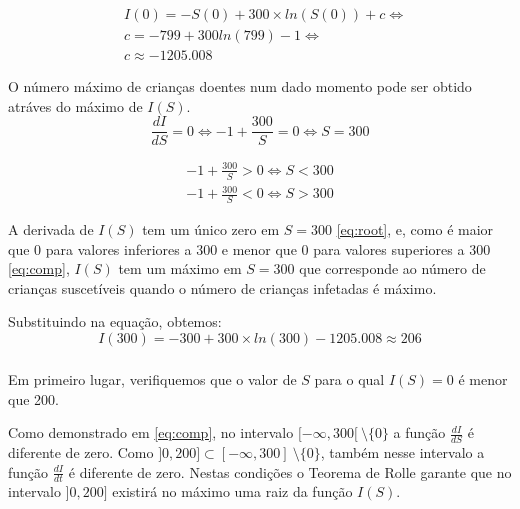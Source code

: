 \documentclass[portuguese, a4paper]{article}
\newcommand\eq[0]{\Leftrightarrow}
\begin{document}
		\begin{equation}
		\begin{split}
			& I(0) = -S(0) + 300 \times ln(S(0)) + c \eq \\
			& c = -799 + 300ln(799) - 1 \eq \\
			& c \approx -1205.008
		\end{split}
		\end{equation}

		\par
		O número máximo de crianças doentes num dado momento pode ser obtido
		atráves do máximo de $I(S)$.
		\begin{equation}
			\label{eq:root}
			\frac{dI}{dS} = 0 \eq -1 + \frac{300}{S} = 0
			\eq S = 300
		\end{equation}

		\begin{equation}
		\begin{split}
			\label{eq:comp}
			 -1 + \frac{300}{S} > 0 \eq S < 300 \\
			 -1 + \frac{300}{S} < 0 \eq S > 300
		\end{split}
		\end{equation}

		\par
		A derivada de $I(S)$ tem um único zero em $S = 300$ \eqref{eq:root},
		e, como é maior que 0 para valores inferiores a 300 e menor que 0
		para valores superiores a 300 \eqref{eq:comp}, $I(S)$ tem um máximo
		em $S = 300$ que corresponde ao número de crianças suscetíveis
		quando o número de crianças infetadas é máximo.

		\par
		Substituindo na equação, obtemos:
		\begin{equation}
			I(300) = -300 + 300 \times ln(300) - 1205.008 \approx 206
		\end{equation}

		\subsubsection{} \label{sec:III.2b)}
		\par
		Em primeiro lugar, verifiquemos que o valor de $S$ para o qual $I(S) = 0$ é menor que 200.

		\par
		Como demonstrado em \eqref{eq:comp}, no intervalo
		$[-\infty,300[~\setminus\{0\}$ a função $\frac{dI}{dS}$ é diferente de
		zero. Como $]0,200] \subset [-\infty,300]~\setminus\{0\}$, também nesse
		intervalo a função $\frac{dI}{dt}$ é diferente de zero. Nestas condições
		o Teorema de Rolle garante que no intervalo $]0,200]$ existirá no máximo
		uma raiz da função $I(S)$.
\end{document}
